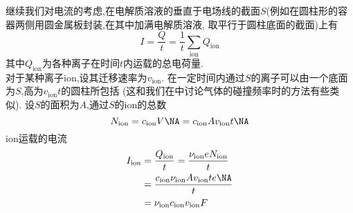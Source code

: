 \documentclass{ctexart}
\begin{document}
\begin{derivation}
    继续我们对电流的考虑,在电解质溶液的垂直于电场线的截面$S$(例如在圆柱形的容器两侧用圆金属板封装,在其中加满电解质溶液,%
    取平行于圆柱底面的截面)上有
    \[I=\dfrac{Q}{t}=\dfrac{1}{t}\sum_{\text{ion}}Q_\text{ion}\]
    其中$Q_\text{ion}$为各种离子在时间$t$内运载的总电荷量.\\
    对于某种离子ion,设其迁移速率为$v_{\text{ion}}$.%
    在一定时间内通过$S$的离子可以由一个底面为$S$,高为$v_{\text{ion}}t$的圆柱所包括%
    (这和我们在中讨论气体的碰撞频率时的方法有些类似).%
    设$S$的面积为$A$,通过$S$的ion的总数
    \[N_{\text{ion}}=c_{\text{ion}}V\NA=c_{\text{ion}}Av_{\text{ion}}t\NA\]
    ion运载的电流
    \[\begin{aligned}
        I_{\text{ion}}
        &= \dfrac{Q_{\text{ion}}}{t}=\dfrac{\nu_{\text{ion}}eN_{\text{ion}}}{t} \\
        &= \dfrac{c_{\text{ion}}\nu_{\text{ion}}Av_{\text{ion}}te\NA}{t} \\
        &= \nu_{\text{ion}}c_{\text{ion}}v_{\text{ion}}F
    \end{aligned}\]
\end{derivation}
\end{document}
